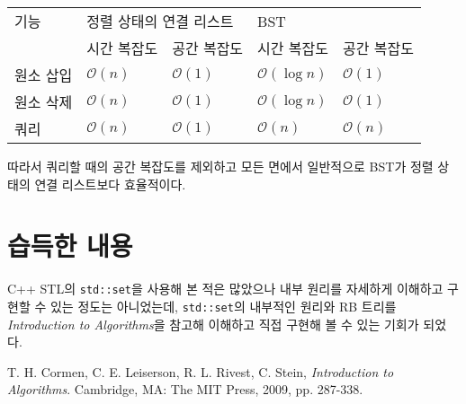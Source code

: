 \begin{tabularx}{\textwidth}{X|l|l|l|l}
    기능 & \multicolumn{2}{l|}{정렬 상태의 연결 리스트} & \multicolumn{2}{l}{BST} \\
     & 시간 복잡도 & 공간 복잡도 & 시간 복잡도 & 공간 복잡도 \\
    \hline
    원소 삽입 & $\mathcal{O}\left(n\right)$ & $\mathcal{O}\left(1\right)$ & $\mathcal{O}\left(\log n\right)$ & $\mathcal{O}\left(1\right)$ \\
    원소 삭제 & $\mathcal{O}\left(n\right)$ & $\mathcal{O}\left(1\right)$ & $\mathcal{O}\left(\log n\right)$ & $\mathcal{O}\left(1\right)$ \\
    쿼리 & $\mathcal{O}\left(n\right)$ & $\mathcal{O}\left(1\right)$ & $\mathcal{O}\left(n\right)$ & $\mathcal{O}\left(n\right)$ \\
\end{tabularx}

따라서 쿼리할 때의 공간 복잡도를 제외하고 모든 면에서 일반적으로 BST가 정렬 상태의 연결 리스트보다 효율적이다.

\section{습득한 내용}
C++ STL의 \texttt{std::set}을 사용해 본 적은 많았으나 내부 원리를 자세하게 이해하고 구현할 수 있는 정도는 아니었는데,
\texttt{std::set}의 내부적인 원리와 RB 트리를 \textit{Introduction to Algorithms}을 참고해 이해하고 직접 구현해 볼 수 있는 기회가 되었다.

\begin{thebibliography}{1}
     T. H. Cormen, C. E. Leiserson, R. L. Rivest, C. Stein, \textit{Introduction
    to Algorithms}. Cambridge, MA: The MIT Press, 2009, pp. 287-338.
\end{thebibliography}


